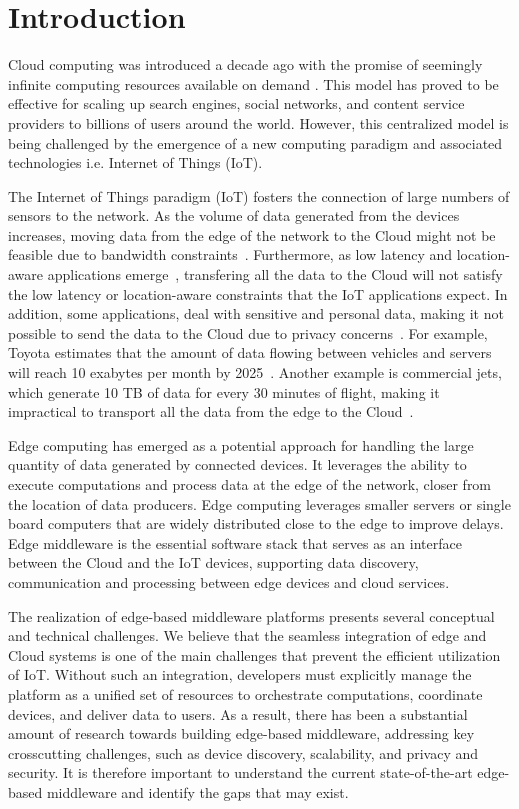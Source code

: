 \section{Introduction}
Cloud computing was introduced a decade ago with the promise of seemingly infinite computing resources available on demand \cite{Armbrust09abovethe}. This model has proved to be effective for scaling up search engines\cite{7073834}, social networks\cite{6596496}, and content service providers\cite{6915771} to billions of users around the world. However, this centralized model is being challenged by the emergence of a new computing paradigm and associated technologies i.e. Internet of Things (IoT).

The Internet of Things paradigm (IoT) fosters the connection of large numbers of sensors to the network. As the volume of data generated from the devices increases, moving data from the edge of the network to the Cloud might not be feasible due to bandwidth constraints~\cite{8289317}. Furthermore, as low latency and location-aware applications emerge~\cite{7389122}, transfering all the data to the Cloud will not satisfy the low latency or location-aware constraints that the IoT applications expect. In addition, some applications, deal with sensitive and personal data, making it not possible to send the data to the Cloud due to privacy concerns~\cite{7849185}. For example, Toyota estimates that the amount of data flowing between vehicles and servers will reach 10 exabytes per month by 2025~\cite{Toyota}. Another example is commercial jets, which generate 10 TB of data for every 30 minutes of flight, making it impractical to transport all the data from the edge to the Cloud~\cite{ciscoJet}. 

Edge computing has emerged as a potential approach for handling the large quantity of data generated by connected devices. It leverages the ability to execute computations and process data at the edge of the network, closer from the location of data producers. Edge computing leverages smaller servers or single board computers that are widely distributed close to the edge to improve delays. Edge middleware is the essential software stack that serves as an interface between the Cloud and the IoT devices, supporting data discovery, communication and processing between edge devices and cloud services. %

The realization of edge-based middleware platforms presents several conceptual and technical challenges. We believe that the seamless integration of edge and Cloud systems is one of the main challenges that prevent the efficient utilization of IoT. Without such an integration, developers must explicitly manage the platform as a unified set of resources to orchestrate computations, coordinate devices, and deliver data to users. As a result, there has been a substantial amount of research towards building edge-based middleware, addressing key crosscutting challenges, such as device discovery, scalability, and privacy and security. It is therefore important to understand the current state-of-the-art edge-based middleware and identify the gaps that may exist.

